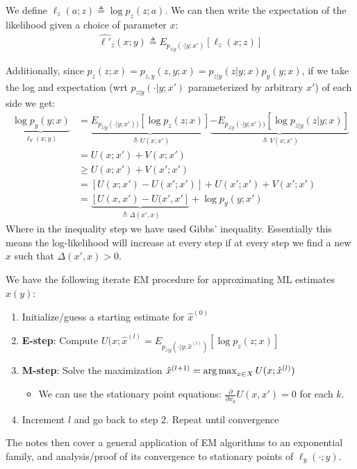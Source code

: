 \documentclass[12pt]{article} %
\begin{document}
We define $\ell_z(a;z) \triangleq \log p_z(z;a)$. We can then write  the expectation of the likelihood given a choice of parameter $x$:
\begin{align*}
    \hat{\ell'}_z(x;y) 
    \triangleq E_{p_{z|y}(\cdot|y;x')}[\ell_z(x;z)]
\end{align*}

Additionally, since $p_z(z;x) = p_{z,y}(z,y;x) = p_{z|y}(z|y;x) p_y(y;x)$, if we take the log and expectation (wrt $p_{z|y}(\cdot|y;x')$ parameterized by arbitrary $x'$) of each side we get:
\begin{align*}
    \underbrace{\log p_y(y;x)}_{\ell_Y(x;y)} 
    &= 
    \underbrace{E_{p_{z|y}(\cdot|y;x'))}[\log p_z(z;x)]}_{\triangleq U(x;x')}
    \underbrace{- E_{p_{z|y}(\cdot|y;x'))}[\log p_{z|y}(z|y;x)]}_{\triangleq V(x;x')} \\
    &= U(x;x') + V(x;x') \\
    &\geq U(x;x') + V(x';x') \\
    &= [U(x;x') - U(x';x')] + U(x';x') + V(x';x') \\
    &= \underbrace{[U(x,x') - U(x',x']}_{\triangleq \Delta (x',x)} + \log p_y(y;x')
\end{align*}
Where in the inequality step we have used Gibbs' inequality. Essentially this means the log-likelihood will increase at every step if at every step we find a new $x$ such that $\Delta (x',x) > 0$.

\separate


We have the following iterate EM procedure for approximating ML estimates $\hat{x}(y)$:
\begin{enumerate}[topsep=-1pt, itemsep=-1pt]
    \item 
Initialize/guess a starting estimate for $\hat{x}^{(0)}$

    \item
\textbf{E-step}: Compute $U(x;\hat{x}^{(l)} = E_{p_{z|y}(\cdot|y;\hat{x}^{(l)})}[\log p_z(z;x)]$ 

    \item 
\textbf{M-step}: Solve the maximization $\hat{x}^{(l+1)} = \operatorname*{arg\,max}_{x \in X} U(x;\hat{x}^{(l)})$
\begin{itemize}[topsep=-1pt, itemsep=-1pt]
    \item 
We can use the stationary point equations: $\frac{\partial}{\partial x_k}U(x,x') = 0$ for each $k$.
    
\end{itemize}
    \item 
Increment $l$ and go back to step 2. Repeat until convergence
    
\end{enumerate}
The notes then cover a general application of EM algorithms to an exponential family, and analysis/proof of its convergence to stationary points of $\ell_y(\cdot;y)$.
\end{document}
